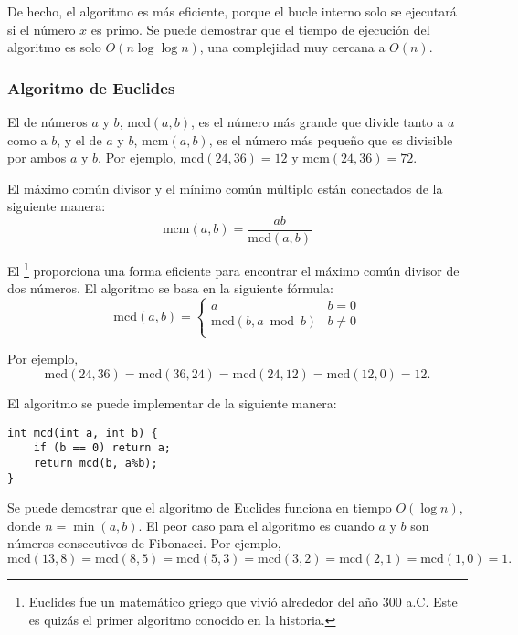 De hecho, el algoritmo es más eficiente,
porque el bucle interno solo se ejecutará si
el número $x$ es primo.
Se puede demostrar que el tiempo de ejecución del
algoritmo es solo $O(n \log \log n)$,
una complejidad muy cercana a $O(n)$.

\subsubsection{Algoritmo de Euclides}


El  de
números $a$ y $b$, $\textrm{mcd}(a,b)$,
es el número más grande que divide tanto a $a$ como a $b$,
y el  de
$a$ y $b$, $\textrm{mcm}(a,b)$,
es el número más pequeño que es divisible por
ambos $a$ y $b$.
Por ejemplo,
$\textrm{mcd}(24,36)=12$ y
$\textrm{mcm}(24,36)=72$.

El máximo común divisor y el mínimo común múltiplo
están conectados de la siguiente manera:
\[\textrm{mcm}(a,b)=\frac{ab}{\textrm{mcd}(a,b)}\]

El \footnote{Euclides fue un matemático griego que
    vivió alrededor del año 300 a.C. Este es quizás el primer algoritmo conocido en la historia.} proporciona una forma eficiente
para encontrar el máximo común divisor de dos números.
El algoritmo se basa en la siguiente fórmula:
\begin{equation*}
    \textrm{mcd}(a,b) = \begin{cases}
        a                         & b = 0    \\
        \textrm{mcd}(b,a \bmod b) & b \neq 0 \\
    \end{cases}
\end{equation*}

Por ejemplo,
\[\textrm{mcd}(24,36) = \textrm{mcd}(36,24)= \textrm{mcd}(24,12) = \textrm{mcd}(12,0)=12.\]

El algoritmo se puede implementar de la siguiente manera:
\begin{lstlisting}
int mcd(int a, int b) {
    if (b == 0) return a;
    return mcd(b, a%b);
}
\end{lstlisting}

Se puede demostrar que el algoritmo de Euclides funciona
en tiempo $O(\log n)$, donde $n=\min(a,b)$.
El peor caso para el algoritmo es
cuando $a$ y $b$ son números consecutivos de Fibonacci.
Por ejemplo,
\[\textrm{mcd}(13,8)=\textrm{mcd}(8,5)
    =\textrm{mcd}(5,3)=\textrm{mcd}(3,2)=\textrm{mcd}(2,1)=\textrm{mcd}(1,0)=1.\]

